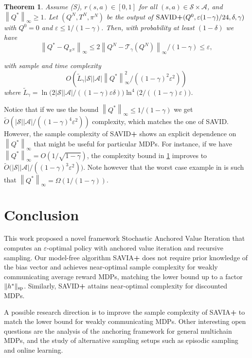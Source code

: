\documentclass{article}
\newcommand{\cA}{\mathcal{A}}
\newcommand{\cS}{\mathcal{S}}
\newcommand{\T}{\mathcal{T}}
\newcommand*{\infn}[1]{\left\|{#1}\right\|_{\infty}}
\renewcommand{\sp}[1]{\|{#1}\|_\text{\rm sp}}
\theoremstyle{plain}
\newtheorem{theorem}{Theorem}[section]
\theoremstyle{definition}
\theoremstyle{remark}
\begin{document}
\begin{theorem}\label{cor:err2-d}
Assume \mbox{\sc (S)}, $  r(s,a) \in [0,1]$ for all $(s,a)\in \cS\times \cA$, and $\infn{Q^*} \ge 1$. Let $(Q^N,T^N,\pi^N)$ be the output of $ \mbox{\rm SAVID\textbf{+}}(Q^0,\varepsilon(1\!-\!\gamma)/24,\delta, \gamma)$ with $Q^0=0$ and $\varepsilon \le 1/(1\!-\!\gamma)$. Then, with probability at least $(1-\delta)$ we have
\vspace{-1ex}
  $$ \infn{Q^*-Q_{\pi^N}}\leq 2\infn{Q^N-\T_\gamma(Q^N)}/(1\!-\!\gamma) \leq \varepsilon,$$
 
  \vspace{-2ex}
   with sample and time complexity $${O\!}\left(\widetilde{L}_{\gamma}|\cS||\cA|\infn{Q^*}^{2}/((1\!-\!\gamma)^2\varepsilon^{2})\right)$$
   where $\widetilde{L}_{\gamma}= \ln \big(2|\cS||\cA|/((1\!-\!\gamma)\varepsilon \delta)\big)\ln^4 \big(2/((1\!-\!\gamma)\varepsilon)\big)$.
\end{theorem}
Notice that if we use the bound $\infn{Q^*} \le 1/(1\!-\!\gamma)$ we get $\widetilde{O}(|\cS||\cA|/((1\!-\!\gamma)^4\varepsilon^{2}))$ complexity, which matches the one of \mbox{\rm SAVID}. However, the sample complexity of \mbox{\rm SAVID\textbf{+}} shows an explicit dependence on $\infn{Q^*}$ that might be useful for particular MDPs. For instance, if we have $\infn{Q^*} = O(1/\sqrt{1-\gamma})$, the complexity bound in \cref{cor:err2-d} improves to $\widetilde{O}\big(|\cS||\cA|/((1\!-\!\gamma)^3\varepsilon^{2})\big)$. Note however that the worst case example in \citep{gheshlaghi2013minimax} is such that $\infn{Q^*}= \Omega(1/(1\!-\!\gamma))$. 





\section{Conclusion}
This work proposed a novel framework Stochastic Anchored Value Iteration that computes an $\varepsilon$-optimal policy with anchored value iteration and recursive sampling. Our model-free algorithm \mbox{\rm SAVIA\textbf{+}} does not require prior knowledge of the bias vector and achieves near-optimal sample complexity for weakly communicating average reward MDPs,  matching the lower bound up to a factor $\sp{h^*}$. Similarly, \mbox{\rm SAVID\textbf{+}} attains near-optimal  complexity for discounted MDPs.  

A possible research direction is to improve the sample complexity of \mbox{\rm SAVIA\textbf{+}} to match the lower bound for weakly communicating MDPs. Other interesting open questions are the analysis of the anchoring framework for general multichain MDPs, and the study of alternative sampling setups such as episodic sampling and online  learning. 
\end{document}
